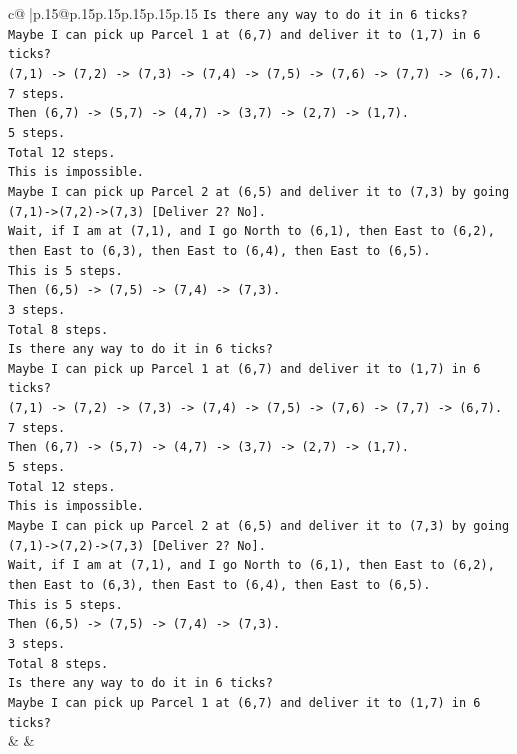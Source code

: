 \documentclass{article}
\begin{document}
{\begin{supertabular}{c@{$\;$}|p{.15\linewidth}@{}p{.15\linewidth}p{.15\linewidth}p{.15\linewidth}p{.15\linewidth}p{.15\linewidth}}
{{{\texttt{Is there any way to do it in 6 ticks?} \\
\texttt{Maybe I can pick up Parcel 1 at (6,7) and deliver it to (1,7) in 6 ticks?} \\
\texttt{(7,1) {-}> (7,2) {-}> (7,3) {-}> (7,4) {-}> (7,5) {-}> (7,6) {-}> (7,7) {-}> (6,7).} \\
\texttt{7 steps.} \\
\texttt{Then (6,7) {-}> (5,7) {-}> (4,7) {-}> (3,7) {-}> (2,7) {-}> (1,7).} \\
\texttt{5 steps.} \\
\texttt{Total 12 steps.} \\
\texttt{This is impossible.} \\
\texttt{Maybe I can pick up Parcel 2 at (6,5) and deliver it to (7,3) by going (7,1){-}>(7,2){-}>(7,3) {[}Deliver 2? No{]}.} \\
\texttt{Wait, if I am at (7,1), and I go North to (6,1), then East to (6,2), then East to (6,3), then East to (6,4), then East to (6,5).} \\
\texttt{This is 5 steps.} \\
\texttt{Then (6,5) {-}> (7,5) {-}> (7,4) {-}> (7,3).} \\
\texttt{3 steps.} \\
\texttt{Total 8 steps.} \\
\texttt{Is there any way to do it in 6 ticks?} \\
\texttt{Maybe I can pick up Parcel 1 at (6,7) and deliver it to (1,7) in 6 ticks?} \\
\texttt{(7,1) {-}> (7,2) {-}> (7,3) {-}> (7,4) {-}> (7,5) {-}> (7,6) {-}> (7,7) {-}> (6,7).} \\
\texttt{7 steps.} \\
\texttt{Then (6,7) {-}> (5,7) {-}> (4,7) {-}> (3,7) {-}> (2,7) {-}> (1,7).} \\
\texttt{5 steps.} \\
\texttt{Total 12 steps.} \\
\texttt{This is impossible.} \\
\texttt{Maybe I can pick up Parcel 2 at (6,5) and deliver it to (7,3) by going (7,1){-}>(7,2){-}>(7,3) {[}Deliver 2? No{]}.} \\
\texttt{Wait, if I am at (7,1), and I go North to (6,1), then East to (6,2), then East to (6,3), then East to (6,4), then East to (6,5).} \\
\texttt{This is 5 steps.} \\
\texttt{Then (6,5) {-}> (7,5) {-}> (7,4) {-}> (7,3).} \\
\texttt{3 steps.} \\
\texttt{Total 8 steps.} \\
\texttt{Is there any way to do it in 6 ticks?} \\
\texttt{Maybe I can pick up Parcel 1 at (6,7) and deliver it to (1,7) in 6 ticks?} \\
            }
        }
    }
    & & \\ \\


\end{supertabular}}
\end{document}
